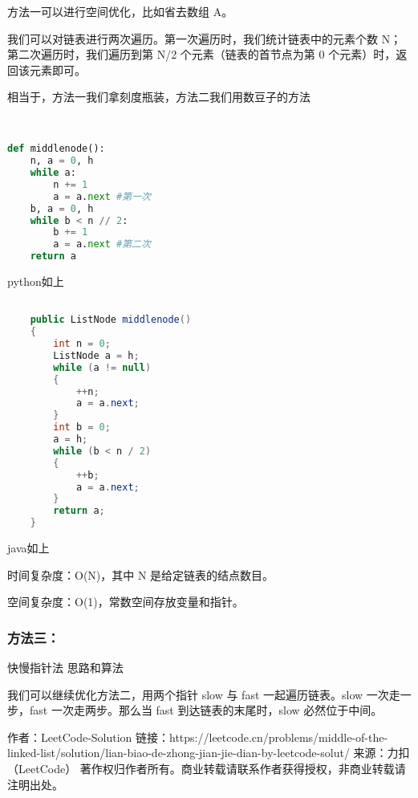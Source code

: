 方法一可以进行空间优化，比如省去数组 A。

我们可以对链表进行两次遍历。第一次遍历时，我们统计链表中的元素个数 N；第二次遍历时，我们遍历到第 N/2 个元素（链表的首节点为第 0 个元素）时，返回该元素即可。

相当于，方法一我们拿刻度瓶装，方法二我们用数豆子的方法
\begin{lstlisting}[language=python]


def middlenode():
    n, a = 0, h
    while a:
        n += 1
        a = a.next #第一次
    b, a = 0, h
    while b < n // 2:
        b += 1
        a = a.next #第二次
    return a

\end{lstlisting}
python如上
\begin{lstlisting}[language=java]

    public ListNode middlenode() 
    {
        int n = 0;
        ListNode a = h;
        while (a != null) 
        {
            ++n;
            a = a.next;
        }
        int b = 0;
        a = h;
        while (b < n / 2) 
        {
            ++b;
            a = a.next;
        }
        return a;
    }

\end{lstlisting}
java如上

时间复杂度：O(N)，其中 N 是给定链表的结点数目。

空间复杂度：O(1)，常数空间存放变量和指针。

\subsubsection{方法三：}快慢指针法
思路和算法

我们可以继续优化方法二，用两个指针 slow 与 fast 一起遍历链表。slow 一次走一步，fast 一次走两步。那么当 fast 到达链表的末尾时，slow 必然位于中间。

作者：LeetCode-Solution
链接：https://leetcode.cn/problems/middle-of-the-linked-list/solution/lian-biao-de-zhong-jian-jie-dian-by-leetcode-solut/
来源：力扣（LeetCode）
著作权归作者所有。商业转载请联系作者获得授权，非商业转载请注明出处。
